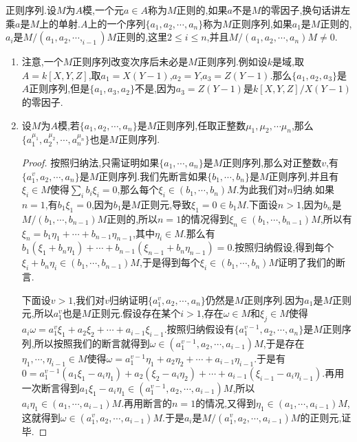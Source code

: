 正则序列.设$M$为$A$模,一个元$a\in A$称为$M$正则的,如果$a$不是$M$的零因子,换句话讲左乘$a$是$M$上的单射.$A$上的一个序列$\{a_1,a_2,\cdots,a_n\}$称为$M$正则序列,如果$a_1$是$M$正则的,$a_i$是$M/(a_1,a_2,\cdots,_{i-1})M$正则的,这里$2\le i\le n$,并且$M/(a_1,a_2,\cdots,a_n)M\not=0$.
\begin{enumerate}
	\item 注意,一个$M$正则序列改变次序后未必是$M$正则序列.例如设$k$是域,取$A=k[X,Y,Z]$,取$a_1=X(Y-1)$,$a_2=Y$,$a_3=Z(Y-1)$.那么$\{a_1,a_2,a_3\}$是$A$正则序列,但是$\{a_1,a_3,a_2\}$不是,因为$a_3=Z(Y-1)$是$k[X,Y,Z]/X(Y-1)$的零因子.
	\item 设$M$为$A$模,若$\{a_1,a_2,\cdots,a_n\}$是$M$正则序列,任取正整数$\mu_1,\mu_2,\cdots\mu_n$,那么$\{a_1^{\mu_1},a_2^{\mu_2},\cdots,a_n^{\mu_n}\}$也是$M$正则序列.
	\begin{proof}
		
		按照归纳法,只需证明如果$\{a_1,\cdots,a_n\}$是$M$正则序列,那么对正整数$v$,有$\{a_1^v,a_2,\cdots,a_n\}$是$M$正则序列.我们先断言如果$\{b_1,\cdots,b_n\}$是$M$正则序列,并且有$\xi_i\in M$使得$\sum_ib_i\xi_i=0$,那么每个$\xi_i\in(b_1,\cdots,b_n)M$.为此我们对$n$归纳.如果$n=1$,有$b_1\xi_1=0$,因为$b_1$是$M$正则元,导致$\xi_1=0\in b_1M$.下面设$n>1$,因为$b_n$是$M/(b_1,\cdots,b_{n-1})M$正则的,所以$n=1$的情况得到$\xi_n\in(b_1,\cdots,b_{n-1})M$,所以有$\xi_n=b_1\eta_1+\cdots+b_{n-1}\eta_{n-1}$,其中$\eta_i\in M$.那么有$b_1(\xi_1+b_n\eta_1)+\cdots+b_{n-1}(\xi_{n-1}+b_n\eta_{n-1})=0$.按照归纳假设,得到每个$\xi_i+b_n\eta_i\in(b_1,\cdots,b_{n-1})M$,于是得到每个$\xi_i\in(b_1,\cdots,b_n)M$证明了我们的断言.
		
		\qquad
		
		下面设$v>1$,我们对$v$归纳证明$\{a_1^v,a_2,\cdots,a_n\}$仍然是$M$正则序列.因为$a_1$是$M$正则元,所以$a_1^v$也是$M$正则元.假设存在某个$i>1$,存在$\omega\in M$和$\xi_j\in M$使得$a_i\omega=a_1^v\xi_1+a_2\xi_2+\cdots+a_{i-1}\xi_{i-1}$.按照归纳假设有$\{a_1^{v-1},a_2,\cdots,a_n\}$是$M$正则序列,所以按照我们的断言就得到$\omega\in(a_1^{v-1},a_2,\cdots,a_{i-1})M$,于是存在$\eta_1,\cdots,\eta_{i-1}\in M$使得$\omega=a_1^{v-1}\eta_1+a_2\eta_2+\cdots+a_{i-1}\eta_{i-1}$.于是有$0=a_1^{v-1}(a_1\xi_1-a_i\eta_1)+a_2(\xi_2-a_i\eta_2)+\cdots+a_{i-1}(\xi_{i-1}-a_i\eta_{i-1})$.再用一次断言得到$a_1\xi_1-a_i\eta_1\in(a_1^{v-1},a_2,\cdots,a_{i-1})M$,所以$a_i\eta_1\in(a_1,\cdots,a_{i-1})M$.再用断言的$n=1$的情况,又得到$\eta_1\in(a_1,\cdots,a_{i-1})M$,这就得到$\omega\in(a_1^v,a_2,\cdots,a_{i-1})M$.于是$a_i$是$M/(a_1^v,a_2,\cdots,a_{i-1})M$的正则元,证毕.
	\end{proof}
\end{enumerate}

